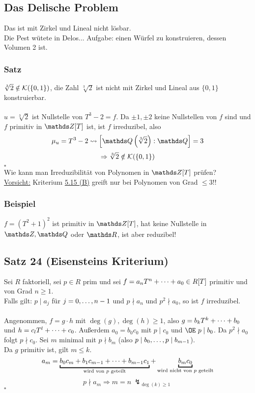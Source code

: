 \subsection{Das Delische Problem}
\label{sub:delisches_problem}
Das  ist mit Zirkel und Lineal nicht lösbar.\\
Die Pest wütete in Delos... Aufgabe: einen Würfel zu konstruieren, dessen Volumen 2 ist.

\subsubsection*{Satz}
$\sqrt[3]{2}\notin \mathcal{K}(\{0,1\})$, die Zahl $\sqrt[3]{2}$ ist nicht mit Zirkel und Lineal aus $\{0,1\}$ konstruierbar.\\

\\
$u=\sqrt[3]{2}$ ist Nullstelle von $T^3-2=f$.
Da $\pm1,\pm2$ keine Nullstellen von $f$ sind und $f$ primitiv in $\Z[T]$ ist, ist $f$ irreduzibel, also
\[
\mu_u=T^3-2\rightsquigarrow \left[\Q\enbrace{\sqrt[3]{2}}:\Q\right]=3
\]
\[
\Rightarrow \sqrt[3]{2}\notin \mathcal{K}(\{0,1\})
\]
\hfill $\square$\\

Wie kann man Irreduzibilität von Polynomen in $\Z[T]$ prüfen?\\
\uline{Vorsicht:} Kriterium \hyperref[sub:bemerkung]{5.15 (B)} greift nur bei Polynomen von Grad $\le3$!!\\

\subsubsection*{Beispiel}
$f=(T^2+1)^2$ ist primitiv in $\Z[T]$, hat keine Nullstelle in $\Z,\Q$ oder $\R$, ist aber reduzibel!

\subsection{Satz 24 (Eisensteins Kriterium)}
\label{sub:satz_24}
Sei $R$ faktoriell, sei $p\in R$ prim und sei $f=a_nT^n+ \dots +a_0\in R[T]$ primitiv und von Grad $n\ge 1$.\\
Falls gilt: $p\mid a_j$ für $j=0, \dots ,n-1$ und $p\nmid a_n$ und $p^2\nmid a_0$, so ist $f$ irreduzibel.\\

\\
Angenommen, $f=g\cdot h$ mit $\deg(g),\deg(h)\ge 1$, also $g=b_kT^k+ \dots +b_0$ und $h=c_lT^l+ \dots +c_0$. 
Außerdem $a_0=b_0c_0$ mit $p\mid c_0$ und $\OE~p\mid b_0$.
Da $p^2\nmid a_0$ folgt $p\nmid c_0$.
Sei $m$ minimal mit $p\nmid b_m$ (also $p\mid b_0, \dots ,p\mid b_{m-1}$).\\
Da $g$ primitiv ist, gilt $m\le k$.
\[
a_m=\underbracket{b_0c_m+b_1c_{m-1}\dt{+}b_{m-1}c_1}_{\text{wird von }p\text{ geteilt}}+\underbracket{b_mc_0}_{\text{wird nicht von }p \text{ geteilt}}
\]
\[
p\nmid a_m\Rightarrow m=n~\lightning_{\deg(k)\ge 1}
\]
\hfill $\square$\\

